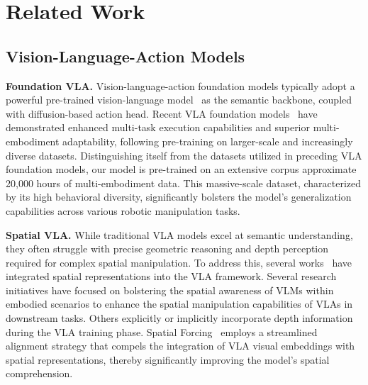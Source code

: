 \section{Related Work}\label{sec:related}

\subsection{Vision-Language-Action Models}
\textbf{Foundation VLA.} 
Vision-language-action foundation models typically adopt a powerful pre-trained vision-language model~\cite{bai2025qwen2, paligemma} as the semantic backbone, coupled with diffusion-based action head.
Recent VLA foundation models~\cite{pi_0, pi_0d5, gr00tN1, gr00t_n1_6, gemini_robotics, walloss, galaxeaG0, magma, gr3} have demonstrated enhanced multi-task execution capabilities and superior multi-embodiment adaptability, following pre-training on larger-scale and increasingly diverse datasets.
Distinguishing itself from the datasets utilized in preceding VLA foundation models, our model is pre-trained on an extensive corpus approximate 20,000 hours of multi-embodiment data. This massive-scale dataset, characterized by its high behavioral diversity, significantly bolsters the model's generalization capabilities across various robotic manipulation tasks.


\noindent
\textbf{Spatial VLA.} 
While traditional VLA models excel at semantic understanding, they often struggle with precise geometric reasoning and depth perception required for complex spatial manipulation.
To address this, several works~\cite{spatialvla, Spatial_forcing, internvla_M1, guo2025omnivla, magma, gemini_robotics_1d5, geovla} have integrated spatial representations into the VLA framework.
Several research~\cite{magma, internvla_M1, gemini_robotics} initiatives have focused on bolstering the spatial awareness of VLMs within embodied scenarios to enhance the spatial manipulation capabilities of VLAs in downstream tasks. 
Others explicitly or implicitly incorporate depth information during the VLA training phase.
Spatial Forcing~\cite{Spatial_forcing} employs a streamlined alignment strategy that compels the integration of VLA visual embeddings with spatial representations, thereby significantly improving the model's spatial comprehension.


